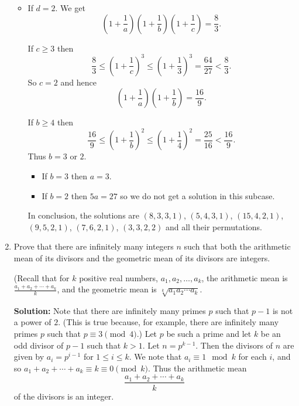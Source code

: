 \documentclass{article}
\newcommand{\solution}[1]{%
\ifsolutions%
    \textbf{Solution: } #1
\fi
}
\begin{document}
\begin{enumerate}
{\begin{itemize}
\begin{itemize}
\item If $c = 1$ then $\left( 1 + \frac{1}{a} \right) \left( 1 + \frac{1}{b} \right) = 1$ which is impossible since $\left( 1 + \frac{1}{a} \right) > 1$ and $\left( 1 + \frac{1}{b} \right) > 1$, so there are no solutions in this subcase.

\end{itemize}

\item If $d = 2$. We get
\[
    \left( 1 + \frac{1}{a} \right) \left( 1 + \frac{1}{b} \right) \left( 1 + \frac{1}{c} \right) = \frac{8}{3}.
\]

If $c \geq 3$ then
\[
    \frac{8}{3} \leq {\left( 1 + \frac{1}{c} \right)}^3 \leq {\left( 1 + \frac{1}{3} \right)}^3 = \frac{64}{27} < \frac{8}{3}.
\]
So $c = 2$ and hence
\[
    \left( 1 + \frac{1}{a} \right) \left( 1 + \frac{1}{b} \right) = \frac{16}{9}.
\]

If $b \geq 4$ then
\[
    \frac{16}{9} \leq {\left( 1 + \frac{1}{b} \right)}^2 \leq {\left( 1 + \frac{1}{4} \right)}^2 = \frac{25}{16} < \frac{16}{9}.
\]
Thus $b = 3$ or $2$.

\begin{itemize}
    
\item If $b = 3$ then $a = 3$.

\item If $b = 2$ then $5a = 27$ so we do not get a solution in this subcase.

\end{itemize}

In conclusion, the solutions are $(8, 3, 3, 1)$, $(5, 4, 3, 1)$, $(15, 4, 2, 1)$, $(9, 5, 2, 1)$, $(7, 6, 2, 1)$, $(3, 3, 2, 2)$ and all their permutations.

\end{itemize}}

\item Prove that there are infinitely many integers $n$ such that both the arithmetic mean of its divisors and the geometric mean of its divisors are integers.

(Recall that for $k$ positive real numbers, $a_1, a_2, \dotsc, a_k$, the arithmetic mean is $\frac{a_1 +a_2 +\dotsb +a_k}{k}$, and the geometric mean is $\sqrt[k]{a_1 a_2\dotsb a_k}$.

\solution{Note that there are infinitely many primes $p$ such that $p - 1$ is not a power of $2$. (This is true because, for example, there are infinitely many primes $p$ such that $p \equiv 3 \pmod 4$.) Let $p$ be such a prime and let $k$ be an odd divisor of $p - 1$ such that $k > 1$. Let $n = p^{k - 1}$. Then the divisors of $n$ are given by $a_i = p^{i - 1}$ for $1 \leq i \leq k$. We note that $a_i \equiv 1 \mod k$ for each $i$, and so $a_1 + a_2 + \cdots + a_k \equiv k \equiv 0 \pmod k$. Thus the arithmetic mean
\[
  \frac{a_1 + a_2 + \cdots + a_k}{k}
\]
of the divisors is an integer.

}
\end{enumerate}
\end{document}
